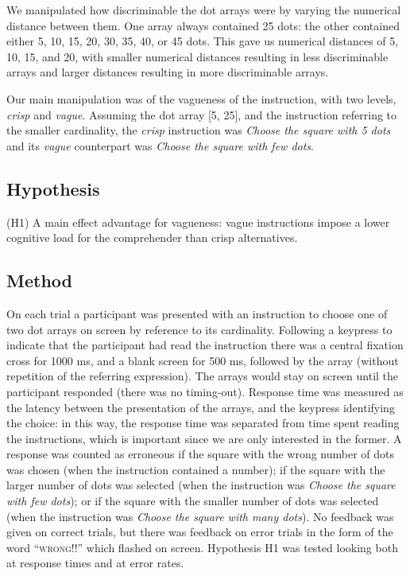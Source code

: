 \documentclass[%
man,		%
floatsintext,%
apacite%
]{apa6}
\begin{document}
We manipulated how discriminable the dot arrays were by varying the numerical distance between them. 
One array always contained 25 dots: the other contained either 5, 10, 15, 20, 30, 35, 40, or 45 dots. 
This gave us numerical distances of 5, 10, 15, and 20, with smaller numerical distances resulting in less discriminable arrays and larger distances resulting in more discriminable arrays. 

Our main manipulation was of the vagueness of the instruction, with two levels, \emph{crisp} and \emph{vague}.
Assuming the dot array [5, 25], and the instruction referring to the smaller cardinality, the \emph{crisp} instruction was \emph{Choose the square with 5 dots} and its \emph{vague} counterpart was \emph{Choose the square with few dots}. 

\subsection{Hypothesis}
\begin{APAenumerate}
	\item [(H1)] A main effect advantage for vagueness: vague instructions impose a lower cognitive load for the comprehender than crisp alternatives.
\end{APAenumerate}

\subsection{Method}

On each trial a participant was presented with an instruction to choose one of two dot arrays on screen by reference to its cardinality. 
Following a keypress to indicate that the participant had read the instruction there was a central fixation cross for 1000 ms, and a blank screen for 500 ms, followed by the array (without repetition of the referring expression). 
The arrays would stay on screen until the participant responded (there was no timing-out). 
Response time was measured as the latency between the presentation of the arrays, and the keypress identifying the choice: in this way, the response time was separated from time spent reading the instructions, which is important since we are only interested in the former. 
A response was counted as erroneous if the square with the wrong number of dots was chosen (when the instruction contained a number); 
if the square with the larger number of dots was selected (when the instruction was \emph{Choose the square with few dots}); 
or if the square with the smaller number of dots was selected (when the instruction was \emph{Choose the square with many dots}). 
No feedback was given on correct trials, but there was feedback on error trials in the form of the word ``\textsc{wrong!!}'' which flashed on screen. Hypothesis H1 was tested looking both at response times and at error rates.
\end{document}

